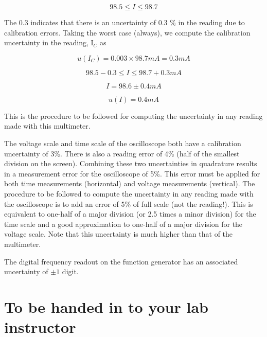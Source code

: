 \begin{equation}
98.5\leq I \leq 98.7
\label{equ:ac9}
\end{equation}

The 0.3 indicates that there is an uncertainty of 0.3 \% in the reading due to calibration errors. Taking the worst case (always), we compute the calibration uncertainty in the reading,  I$_C$  as

\begin{equation}
u(I_C)=0.003\times98.7mA=0.3mA
\label{equ:ac10}
\end{equation}

\begin{equation}
98.5-0.3\leq I\leq 98.7+0.3mA
\label{equ:ac11}
\end{equation}

\begin{equation}
I=98.6\pm 0.4mA
\label{equ:ac12}
\end{equation}

\begin{equation}
u(I)=0.4mA
\label{equ:ac13}
\end{equation}

This is the procedure to be followed for computing the uncertainty in any reading made with this multimeter.

The voltage scale and time scale of the oscilloscope both have a calibration uncertainty of 3\%. There is also a reading error of 4\% (half of the smallest division on the screen). Combining these two uncertainties in quadrature results in a measurement error for the oscilloscope of 5\%. This error must be applied for both time measurements (horizontal) and voltage measurements (vertical). The procedure to be followed to compute the uncertainty in any reading made with the oscilloscope is to add an error of 5\% of full scale (not the reading!). This is equivalent to one-half of a major division (or 2.5 times a minor division) for the time scale and a good approximation to one-half of a major division for the voltage scale. Note that this uncertainty is much higher than that of the multimeter.

The digital frequency readout on the function generator has an associated uncertainty of $\pm 1$ digit.

\section{{\bf To be handed in to your lab instructor}}

